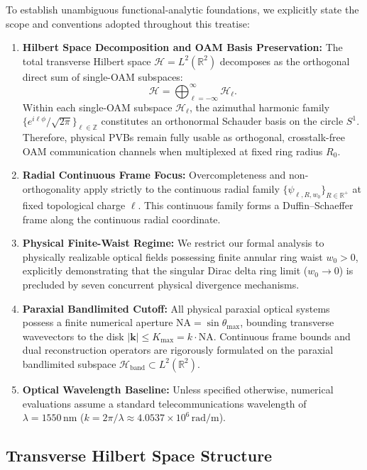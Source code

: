 \documentclass[11pt,a4paper]{article}
\begin{document}
To establish unambiguous functional-analytic foundations, we explicitly state the scope and conventions adopted throughout this treatise:
\begin{enumerate}
    \item \textbf{Hilbert Space Decomposition and OAM Basis Preservation:} The total transverse Hilbert space $\mathcal{H} = L^2(\mathbb{R}^2)$ decomposes as the orthogonal direct sum of single-OAM subspaces:
    \begin{equation}
    \mathcal{H} = \bigoplus_{\ell=-\infty}^\infty \mathcal{H}_\ell.
    \label{eq:direct_sum_decomposition_intro}
    \end{equation}
    Within each single-OAM subspace $\mathcal{H}_\ell$, the azimuthal harmonic family $\{e^{i\ell\phi}/\sqrt{2\pi}\}_{\ell \in \mathbb{Z}}$ constitutes an orthonormal Schauder basis on the circle $S^1$. Therefore, physical PVBs remain fully usable as orthogonal, crosstalk-free OAM communication channels when multiplexed at fixed ring radius $R_0$.
    \item \textbf{Radial Continuous Frame Focus:} Overcompleteness and non-orthogonality apply strictly to the continuous radial family $\{\psi_{\ell, R, w_0}\}_{R \in \mathbb{R}^+}$ at fixed topological charge $\ell$. This continuous family forms a Duffin--Schaeffer frame along the continuous radial coordinate.
    \item \textbf{Physical Finite-Waist Regime:} We restrict our formal analysis to physically realizable optical fields possessing finite annular ring waist $w_0 > 0$, explicitly demonstrating that the singular Dirac delta ring limit ($w_0 \to 0$) is precluded by seven concurrent physical divergence mechanisms.
    \item \textbf{Paraxial Bandlimited Cutoff:} All physical paraxial optical systems possess a finite numerical aperture $\text{NA} = \sin \theta_{\max}$, bounding transverse wavevectors to the disk $|\mathbf{k}| \le K_{\max} = k \cdot \text{NA}$. Continuous frame bounds and dual reconstruction operators are rigorously formulated on the paraxial bandlimited subspace $\mathcal{H}_{\text{band}} \subset L^2(\mathbb{R}^2)$.
    \item \textbf{Optical Wavelength Baseline:} Unless specified otherwise, numerical evaluations assume a standard telecommunications wavelength of $\lambda = 1550\,\text{nm}$ ($k = 2\pi/\lambda \approx 4.0537 \times 10^6\,\text{rad/m}$).
\end{enumerate}

\subsection{Transverse Hilbert Space Structure}
\end{document}
